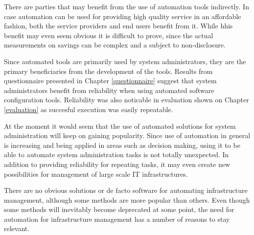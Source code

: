 \documentclass[officiallayout]{tktla}
\begin{document}
There are parties that may benefit from the use of automation tools indirectly.
In case automation can be used for providing high quality service in an
affordable fashion, both the service providers and end users benefit from it.
While hhis benefit may even seem obvious it is difficult to prove, since the
actual measurements on savings can be complex and a subject to non-disclosure.

Since automated tools are primarily used by system administrators, they are the
primary beneficiaries from the development of the tools. Results from
questionnaire presented in Chapter \ref{questionnaire} suggest that system
administrators benefit from reliability when using automated software
configuration tools. Reliability was also noticable in evaluation shown on
Chapter \ref{evaluation} as succesful execution was easily repeatable.

At the moment it would seem that the use of automated solutions for system
administration will keep on gaining popularity. Since use of automation in
general is increasing and being applied in areas such as decision making, using
it to be able to automate system administration tasks is not totally
unexpected. In addition to providing reliability for repeating tasks, it may
even create new possibilities for management of large scale IT infrastructures.

There are no obvious solutions or de facto software for automating
infrastructure management, although some methods are more popular than others.
Even though some methods will inevitably become deprecated at some point, the
need for automation for infrastructure management has a number of reasons to
stay relevant.
\end{document}

